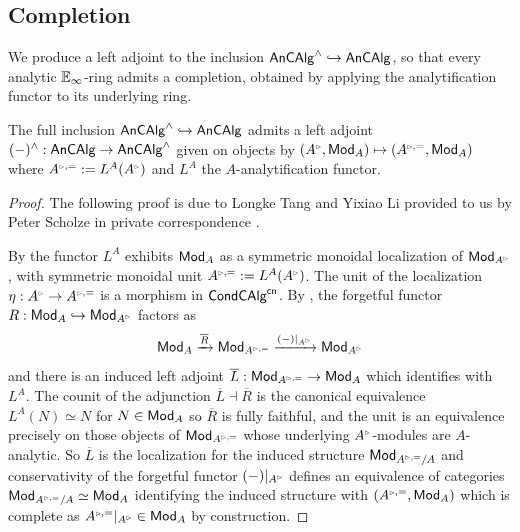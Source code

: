 \subsection{Completion}\label{subsec: completion}
We produce a left adjoint to the inclusion $\mathsf{An}\mathsf{CAlg}^{\wedge}\hookrightarrow\mathsf{An}\mathsf{CAlg}$, so that every analytic $\mathbb{E}_{\infty}$-ring admits a completion, obtained by applying the analytification functor to its underlying ring.
\begin{theorem}\label{thm: completions exist}
    The full inclusion $\mathsf{An}\mathsf{CAlg}^{\wedge}\hookrightarrow\mathsf{An}\mathsf{CAlg}$ admits a left adjoint $(-)^{\wedge}:\mathsf{An}\mathsf{CAlg}\to\mathsf{An}\mathsf{CAlg}^{\wedge}$ given on objects by $(A^{\tri},\Mod_{A})\mapsto (A^{\tri,=},\Mod_{A})$ where $A^{\tri,=}:=L^{A}(A^{\tri})$ and $L^{A}$ the $A$-analytification functor. 
\end{theorem}
\begin{proof}
    The following proof is due to Longke Tang and Yixiao Li provided to us by Peter Scholze in private correspondence \cite{ScholzePC}.

    By the functor $L^{A}$ exhibits $\mathsf{Mod}_{A}$ as a symmetric monoidal localization of $\Mod_{A^{\tri}}$, with symmetric monoidal unit $A^{\tri,=}:=L^{A}(A^{\tri})$. The unit of the localization $\eta:A^{\tri}\to A^{\tri,=}$ is a morphism in $\mathsf{Cond}\mathsf{CAlg}^{\mathsf{cn}}$. By \cite[Const. 5.23]{NilpotenceDescent}, the forgetful functor $R:\Mod_{A}\hookrightarrow\Mod_{A^{\tri}}$ factors as 
    $$\Mod_{A}\xrightarrow{\overline{R}}\Mod_{A^{\tri,=}}\xrightarrow{(-)|_{A^{\tri}}}\Mod_{A^{\tri}}$$ 
    and there is an induced left adjoint $\overline{L}:\Mod_{A^{\tri,=}}\to\Mod_{A}$ which identifies with $L^{A}$. The counit of the adjunction $\overline{L}\dashv\overline{R}$ is the canonical equivalence $L^{A}(N)\simeq N$ for $N\in\mathsf{Mod}_{A}$ so $\overline{R}$ is fully faithful, and the unit is an equivalence precisely on those objects of $\Mod_{A^{\tri,=}}$ whose underlying $A^{\tri}$-modules are $A$-analytic. So $\overline{L}$ is the localization for the induced structure $\Mod_{A^{\tri,=}/A}$ and conservativity of the forgetful functor $(-)|_{A^{\tri}}$ defines an equivalence of categories $\Mod_{A^{\tri,=}/A}\simeq\Mod_{A}$ identifying the induced structure with $(A^{\tri,=},\Mod_{A})$ which is complete as $A^{\tri,=}|_{A^{\tri}}\in\Mod_{A}$ by construction. 


\end{proof}
